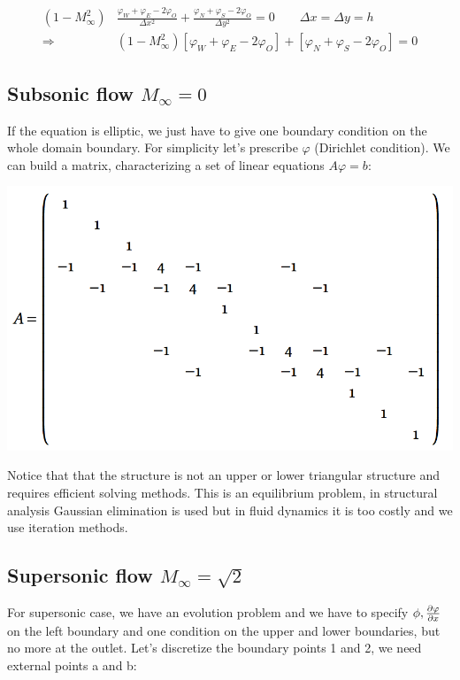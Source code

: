 \begin{equation}
\begin{aligned}
(1 - M_\infty^2) &\frac{\varphi _W + \varphi _E - 2\varphi _O}{\Delta x^2} + \frac{\varphi _N + \varphi _S - 2\varphi _O}{\Delta y^2} = 0 \qquad \Delta x = \Delta y = h \\
\Rightarrow &(1-M_\infty ^2) [\varphi _W + \varphi _E - 2\varphi _O]+[\varphi _N + \varphi _S - 2\varphi _O] = 0
\end{aligned}
\end{equation}

\subsection{Subsonic flow $M_\infty = 0$}
If the equation is elliptic, we just have to give one boundary condition on the whole domain boundary. For simplicity let's prescribe $\varphi$ (Dirichlet condition). We can build a matrix, characterizing a set of linear equations $A\varphi = b$: 

\begin{center}
\includegraphics[scale=0.55]{ch2/8}
\end{center}

Notice that that the structure is not an upper or lower triangular structure and requires efficient solving methods. This is an equilibrium problem, in structural analysis Gaussian elimination is used but in fluid dynamics it is too costly and we use iteration methods. 

\subsection{Supersonic flow $M_\infty = \sqrt{2}$}
For supersonic case, we have an evolution problem and we have to specify $\phi, \frac{\partial \varphi }{\partial x}$ on the left boundary and one condition on the upper and lower boundaries, but no more at the outlet. Let's discretize the boundary points 1 and 2, we need external points a and b: 

